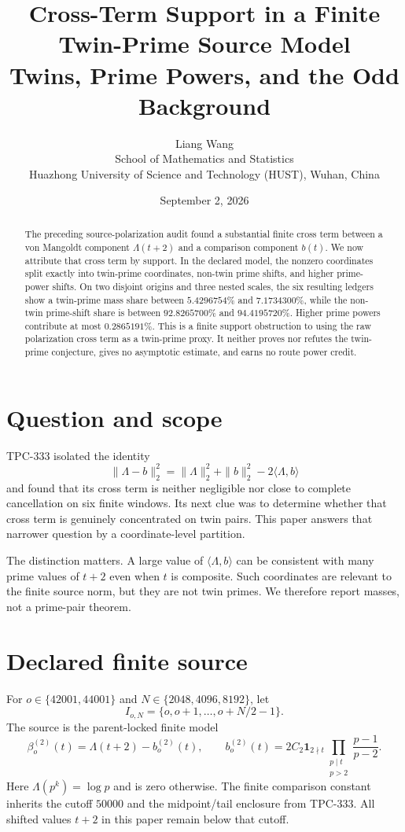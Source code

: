 \documentclass[10pt]{article}
\title{Cross-Term Support in a Finite Twin-Prime Source Model\\
\large Twins, Prime Powers, and the Odd Background}
\author{Liang Wang\\School of Mathematics and Statistics\\
Huazhong University of Science and Technology (HUST), Wuhan, China}
\date{September 2, 2026}
\newcommand{\ind}{\mathbf 1}
\begin{document}
\maketitle

\begin{abstract}
The preceding source-polarization audit found a substantial finite cross term
between a von Mangoldt component $\Lambda(t+2)$ and a comparison component
$b(t)$.  We now attribute that cross term by support.  In the declared model,
the nonzero coordinates split exactly into twin-prime coordinates, non-twin
prime shifts, and higher prime-power shifts.  On two disjoint origins and
three nested scales, the six resulting ledgers show a twin-prime mass share
between $5.4296754\%$ and $7.1734300\%$, while the non-twin prime-shift share
is between $92.8265700\%$ and $94.4195720\%$.  Higher prime powers contribute
at most $0.2865191\%$.  This is a finite support obstruction to using the raw
polarization cross term as a twin-prime proxy.  It neither proves nor refutes
the twin-prime conjecture, gives no asymptotic estimate, and earns no route
power credit.
\end{abstract}

\section{Question and scope}

TPC-333 isolated the identity
\[
 \|\Lambda-b\|_2^2=\|\Lambda\|_2^2+\|b\|_2^2-2\langle\Lambda,b\rangle
\]
and found that its cross term is neither negligible nor close to complete
cancellation on six finite windows.  Its next clue was to determine whether
that cross term is genuinely concentrated on twin pairs.  This paper answers
that narrower question by a coordinate-level partition.

The distinction matters.  A large value of $\langle\Lambda,b\rangle$ can be
consistent with many prime values of $t+2$ even when $t$ is composite.  Such
coordinates are relevant to the finite source norm, but they are not twin
primes.  We therefore report masses, not a prime-pair theorem.

\section{Declared finite source}

For $o\in\{42001,44001\}$ and $N\in\{2048,4096,8192\}$, let
\[
 I_{o,N}=\{o,o+1,\ldots,o+N/2-1\}.
\]
The source is the parent-locked finite model
\begin{equation}\label{eq:source}
 \beta_o^{(2)}(t)=\Lambda(t+2)-b_o^{(2)}(t),\qquad
 b_o^{(2)}(t)=2C_2\ind_{2\nmid t}
 \prod_{\substack{p\mid t\\p>2}}\frac{p-1}{p-2}.
\end{equation}
Here $\Lambda(p^k)=\log p$ and is zero otherwise.  The finite comparison
constant inherits the cutoff $50000$ and the midpoint/tail enclosure from
TPC-333.  All shifted values $t+2$ in this paper remain below that cutoff.
\end{document}
